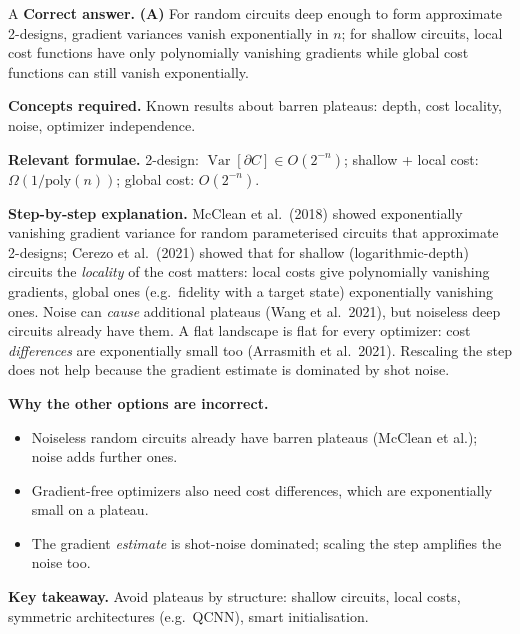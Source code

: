 \documentclass[11pt,a4paper]{article}
\newcommand{\qsep}{\par\vspace{2pt}{\color{black!15}\hrule}\vspace{4pt}}
\begin{document}
\begin{solbox}{A}
\textbf{\color{brand}Correct answer.} \textcolor{okgreen}{\textbf{(A)}} For random circuits deep enough to form approximate 2-designs, gradient variances vanish exponentially in $n$; for shallow circuits, local cost functions have only polynomially vanishing gradients while global cost functions can still vanish exponentially.

\textbf{\color{brand}Concepts required.} Known results about barren plateaus: depth, cost locality, noise, optimizer independence.

\textbf{\color{brand}Relevant formulae.} 2-design: $\operatorname{Var}[\partial C] \in O(2^{-n})$; shallow + local cost: $\Omega(1/\mathrm{poly}(n))$; global cost: $O(2^{-n})$.

\textbf{\color{brand}Step-by-step explanation.} McClean et al.\ (2018) showed exponentially vanishing gradient variance for random parameterised circuits that approximate
2-designs; Cerezo et al.\ (2021) showed that for shallow (logarithmic-depth) circuits the \emph{locality} of the cost matters: local costs
give polynomially vanishing gradients, global ones (e.g.\ fidelity with a target state) exponentially vanishing ones.
Noise can \emph{cause} additional plateaus (Wang et al.\ 2021), but noiseless deep circuits already have them. A flat landscape is flat for
every optimizer: cost \emph{differences} are exponentially small too (Arrasmith et al.\ 2021). Rescaling the step does not help because
the gradient estimate is dominated by shot noise.

\textbf{\color{brand}Why the other options are incorrect.}
\begin{itemize}[leftmargin=2.4em, itemsep=1pt, topsep=2pt]
\item[\textbf{(B)}] Noiseless random circuits already have barren plateaus (McClean et al.); noise adds further ones.
\item[\textbf{(C)}] Gradient-free optimizers also need cost differences, which are exponentially small on a plateau.
\item[\textbf{(D)}] The gradient \emph{estimate} is shot-noise dominated; scaling the step amplifies the noise too.
\end{itemize}
\textbf{\color{brand}Key takeaway.} Avoid plateaus by structure: shallow circuits, local costs, symmetric architectures (e.g.\ QCNN), smart initialisation.
\end{solbox}
\qsep
\end{document}
